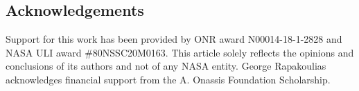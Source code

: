 \documentclass[twoside]{article}
\begin{document}
\subsection*{Acknowledgements}
% 
Support for this work has been provided by 
ONR award N00014-18-1-2828 and NASA ULI award \#80NSSC20M0163.
This article solely reflects the opinions and conclusions of its authors and not of any NASA entity. 
George Rapakoulias acknowledges financial support from the A. Onassis Foundation Scholarship.








\end{document}

